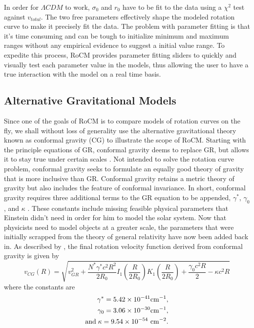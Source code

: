 \documentclass[conference]{IEEEtran-modified}
\providecommand{\e}[1]{\ensuremath{\times 10^{#1}}}
\begin{document}
In order for $\Lambda CDM$ to work, $\sigma_0$ and $r_0$ have to be fit to the data using a $\chi^2$ test against $v_{total}$. The two free parameters effectively shape the modeled rotation curve to make it precisely fit the data. The problem with parameter fitting is that it's time consuming and can be tough to initialize minimum and maximum ranges without any empirical evidence to suggest a initial value range. To expedite this process, RoCM provides parameter fitting sliders to quickly and visually test each parameter value in the models, thus allowing the user to have a true interaction with the model on a real time basis.

\subsection{Alternative Gravitational Models}
Since one of the goals of RoCM is to compare models of rotation curves on the fly, we shall without loss of generality use the alternative gravitational theory known as conformal gravity (CG) to illustrate the scope of RoCM.  Starting with the principle equations of GR, conformal gravity deems to replace GR, but allows it to stay true under certain scales \cite{mannheim}. 
Not intended to solve the rotation curve problem, conformal gravity seeks to formulate an equally good theory of gravity that is more inclusive than GR. Conformal gravity retains a metric theory of gravity but also includes the feature of conformal invariance. In short, conformal gravity requires three additional terms to the GR equation to be appended, $\gamma^*$, $\gamma_0$, and $\kappa$ \cite{mannheim}. These constants include missing feasible physical parameters that Einstein didn't need in order for him to model the solar system. Now that physicists need to model objects at a greater scale, the parameters that were initially scrapped from the theory of general relativity have now been added back in.
 As described by \cite{mannheim}, the final rotation velocity function derived from conformal gravity is given by
\begin{equation}
v_{CG}(R) = \sqrt{v_{GR}^2+\frac{N^*\gamma^*c^2R^2}{2R_0}I_1\left(\frac{R}{2R_0}\right)K_1\left(\frac{R}{2R_0}\right)+\frac{\gamma_0c^2R}{2}-\kappa c^2R}
\end{equation}
where the constants are
\begin{equation*}
\begin{split}
\gamma^*=5.42\e{-41} {\rm cm}^{-1}, \\ 
\gamma_0=3.06\e{-30} {\rm cm}^{-1}, \\ 
\text{and}\; \kappa=9.54\e{-54}~{\rm cm}^{-2}.
\end{split}
\end{equation*} 
\end{document}
